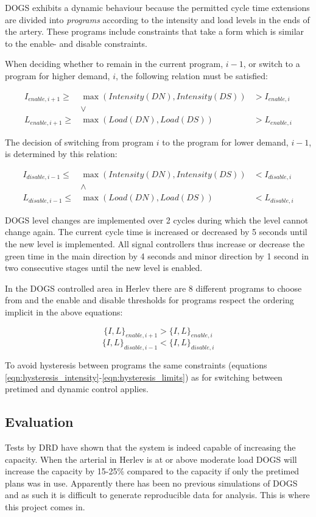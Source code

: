 DOGS exhibits a dynamic behaviour because the permitted cycle time extensions are divided into \textit{programs} according to the intensity and load levels in the ends of the artery. These programs include constraints that take a form which is similar to the enable- and disable constraints.

When deciding whether to remain in the current program, $i-1$, or switch to a program for higher demand, $i$, the following relation must be satisfied:

\begin{eqnarray*}
I_{enable,i+1} \geq & \max(Intensity(DN),Intensity(DS)) & > I_{enable,i} \\
& \vee & \\
L_{enable,i+1} \geq & \max(Load(DN),Load(DS))  & > L_{enable,i}
\end{eqnarray*}

The decision of switching from program $i$ to the program for lower demand, $i-1$, is determined by this relation:

\begin{eqnarray*}
I_{disable,i-1} \leq & \max(Intensity(DN),Intensity(DS)) & < I_{disable,i} \\
& \wedge & \\
L_{disable,i-1} \leq & \max(Load(DN),Load(DS))  & < L_{disable,i}
\end{eqnarray*}

DOGS level changes are implemented over 2 cycles during which the level cannot change again. The current cycle time is increased or decreased by 5 seconds until the new level is implemented. All signal controllers thus increase or decrease the green time in the main direction by 4 seconds and minor direction by 1 second in two consecutive stages until the new level is enabled.

In the DOGS controlled area in Herlev there are 8 different programs to choose from and the enable and disable thresholds for programs respect the ordering implicit in the above equations:

$$\lbrace I,L \rbrace_{enable,i+1} > \lbrace I,L \rbrace_{enable,i}$$
$$\lbrace I,L \rbrace_{disable,i-1} < \lbrace I,L \rbrace_{disable,i}$$

To avoid hysteresis between programs the same constraints (equations \ref{eqn:hysteresis_intensity}-\ref{eqn:hysteresis_limits}) as for switching between pretimed and dynamic control applies.

\subsection{Evaluation}
Tests by DRD \cite{dogs} have shown that the system is indeed capable of increasing the capacity. When the arterial in Herlev is at or above moderate load DOGS will increase the capacity by 15-25\% compared to the capacity if only the pretimed plans was in use. Apparently there has been no previous simulations of DOGS and as such it is difficult to generate reproducible data for analysis. This is where this project comes in.


